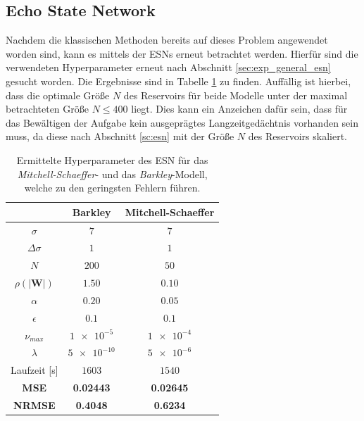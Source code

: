 \FloatBarrier
\subsection{Echo State Network}
Nachdem die klassischen Methoden bereits auf dieses Problem angewendet worden sind, kann es mittels der \textsc{ESN}s erneut betrachtet werden. Hierfür sind die verwendeten Hyperparameter erneut nach Abschnitt \ref{sec:exp_general_esn} gesucht worden. Die Ergebnisse sind in Tabelle \ref{tab:exp_unblur_esn_results} zu finden. Auffällig ist hierbei, dass die optimale Größe $N$ des Reservoirs für beide Modelle unter der maximal betrachteten Größe $N \leq 400$ liegt. Dies kann ein Anzeichen dafür sein, dass für das Bewältigen der Aufgabe kein ausgeprägtes Langzeitgedächtnis vorhanden sein muss, da diese nach Abschnitt \ref{sc:esn} mit der Größe $N$ des Reservoirs skaliert. 

\begin{table}[h]
	\centering
	\captionsetup{width=0.9\linewidth}
	\begin{tabular}{ccc}
		\hline		
		\multicolumn{1}{c}{} &  Barkley & Mitchell-Schaeffer \\ 
		\hline
		\rule[-1ex]{0pt}{2.5ex} $\sigma$ & $7$ & $7$ \\ 
		\rule[-1ex]{0pt}{2.5ex} $\Delta \sigma$ & $1$ & $1$ \\ 
		\rule[-1ex]{0pt}{3.5ex} $N$ & $200$ & $50$ \\ 
		\rule[-1ex]{0pt}{3.5ex} $\rho(|\mathbf{W}|)$ & $1.50$ & $0.10$\\ 
		\rule[-1ex]{0pt}{3.5ex} $\alpha$ & $0.20$ & $0.05$ \\ 
		\rule[-1ex]{0pt}{3.5ex} $\epsilon$ & $0.1$ & $0.1$ \\ 
		\rule[-1ex]{0pt}{3.5ex} $\nu_{max}$ & $\num{1e-5}$ & $\num{1e-4}$\\ 
		\rule[-1ex]{0pt}{3.5ex} $\lambda$ & $\num{5e-10}$ & $\num{5e-6}$\\ 
		\rule[-1ex]{0pt}{2.5ex} Laufzeit [s] & $1603$ & $1540$ \\ 
		\rule[-1ex]{0pt}{2.5ex} \textbf{MSE} & \textbf{0.02443} & \textbf{0.02645} \\ 
		\rule[-1ex]{0pt}{2.5ex} \textbf{NRMSE} & \textbf{0.4048} & \textbf{0.6234} \\ 
		\hline 
	\end{tabular} 
	\caption{Ermittelte Hyperparameter des \textsc{ESN} für das \textit{Mitchell-Schaeffer}- und das \textit{Barkley}-Modell, welche zu den geringsten Fehlern führen.}
	\label{tab:exp_unblur_esn_results}
\end{table}


